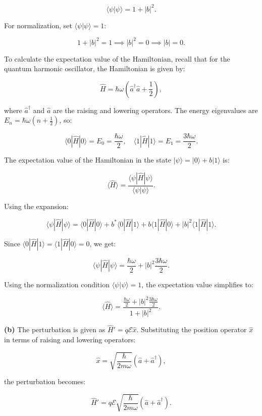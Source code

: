 \documentclass{article}
\begin{document}
\[
\langle \psi | \psi \rangle = 1 + |b|^2.
\]

For normalization, set \(\langle \psi | \psi \rangle = 1\):

\[
1 + |b|^2 = 1 \implies |b|^2 = 0 \implies |b| = 0.
\]

To calculate the expectation value of the Hamiltonian, recall that for the quantum harmonic oscillator, the Hamiltonian is given by:

\[
\hat{H} = \hbar \omega \left( \hat{a}^\dagger \hat{a} + \frac{1}{2} \right),
\]

where \(\hat{a}^\dagger\) and \(\hat{a}\) are the raising and lowering operators. The energy eigenvalues are \(E_n = \hbar \omega \left( n + \frac{1}{2} \right)\), so:

\[
\langle 0 | \hat{H} | 0 \rangle = E_0 = \frac{\hbar \omega}{2}, \quad \langle 1 | \hat{H} | 1 \rangle = E_1 = \frac{3 \hbar \omega}{2}.
\]

The expectation value of the Hamiltonian in the state \(|\psi\rangle = |0\rangle + b|1\rangle\) is:

\[
\langle \hat{H} \rangle = \frac{\langle \psi | \hat{H} | \psi \rangle}{\langle \psi | \psi \rangle}.
\]

Using the expansion:

\[
\langle \psi | \hat{H} | \psi \rangle = \langle 0 | \hat{H} | 0 \rangle + b^* \langle 0 | \hat{H} | 1 \rangle + b \langle 1 | \hat{H} | 0 \rangle + |b|^2 \langle 1 | \hat{H} | 1 \rangle.
\]

Since \(\langle 0 | \hat{H} | 1 \rangle = \langle 1 | \hat{H} | 0 \rangle = 0\), we get:

\[
\langle \psi | \hat{H} | \psi \rangle = \frac{\hbar \omega}{2} + |b|^2 \frac{3 \hbar \omega}{2}.
\]

Using the normalization condition \(\langle \psi | \psi \rangle = 1\), the expectation value simplifies to:

\[
\langle \hat{H} \rangle = \frac{\frac{\hbar \omega}{2} + |b|^2 \frac{3 \hbar \omega}{2}}{1 + |b|^2}.
\]

\textbf{(b)} The perturbation is given as \(\hat{H}' = q \mathcal{E} \hat{x}\). Substituting the position operator \(\hat{x}\) in terms of raising and lowering operators:

\[
\hat{x} = \sqrt{\frac{\hbar}{2m\omega}} (\hat{a} + \hat{a}^\dagger),
\]

the perturbation becomes:

\[
\hat{H}' = q \mathcal{E} \sqrt{\frac{\hbar}{2m\omega}} (\hat{a} + \hat{a}^\dagger).
\]
\end{document}
